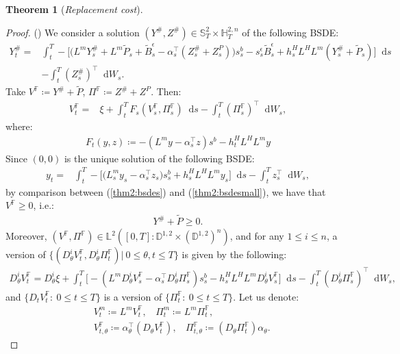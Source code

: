 \documentclass[a4paper, 11pt]{article}              %
\numberwithin{equation}{section}
\theoremstyle{plain}
\newcommand{\1}{\mathds{1}}
\newcommand{\Bt}{\tilde{B}}
\newcommand{\pt}{\tilde{P}}
\newcommand{\dsF}{\mathbb{F}}
\newcommand{\dsH}{\mathbb{H}}
\newcommand{\dsL}{\mathbb{L}}
\newcommand{\dsS}{\mathbb{S}}
\newcommand{\dsD}{\mathbb{D}}
\theoremstyle{plain}
\newtheorem{theorem}[thm]{Theorem}
\theoremstyle{definition}
\newtheorem{theorem}{Theorem}
\theoremstyle{plain}
\newcommand*\df{\mathop{}\!\mathrm{d}}
\newcommand{\rom}[1]{\lowercase\expandafter{\romannumeral #1\relax}}
\begin{document}
\begin{theorem}[\textit{Replacement cost}]
\begin{proof}
(\rom{1}) We consider  a solution $(Y^\#, Z^\#) \in \dsS^2_T \times \dsH^{2, n}_T$  of the following BSDE:
\begin{align}
  Y^\#_t
  =& \int_{t}^{T} -\bigg[\big(L^mY^\#_s+L^m\pt_s +\Bt^\epsilon_s-
     \alpha^\top_s(Z^\#_s+Z^P_s)\big)s^{b}_s - s^\epsilon_s\Bt^\epsilon_s
     +h^H_sL^HL^m(Y^\#_s+\pt_s)\bigg]\df s\nonumber\\
   & -\int_{t}^{T}(Z^\#_s)^\top\df W_s.    \nonumber 
\end{align}
Take $V^\dsF \coloneqq Y^\# + \pt $, $\Pi^\dsF\coloneqq Z^\# + Z^P$. Then:
\begin{align}
  V^\dsF_t
  =& \xi+\int_{t}^{T} F_s(V^\dsF_s, \Pi^\dsF_s)\df s
    -\int_{t}^{T}(\Pi^\dsF_s)^\top\df W_s, \label{thm2:bsdes}
\end{align}
where:
\begin{align}
  \label{eq:3}
  F_t(y, z)\coloneqq -(L^my - \alpha_s^\top z)s^b  -h^H_tL^HL^my
\end{align}
Since $(0,0)$ is the unique solution of the following BSDE:
\begin{align}
 y_t
  =& \int_{t}^{T} -\bigg[\big(L^m_sy_s - \alpha_s^\top z_s\big)s^{b}_s
     +h^H_sL^HL^my_s\bigg]\df s
    -\int_{t}^{T}z^\top_s\df W_s, \label{thm2:bsdesmall}
\end{align}
by comparison between (\ref{thm2:bsdes}) and (\ref{thm2:bsdesmall}), we have
that $V^\dsF \geq0$, i.e.:
\begin{align}
 Y^\# + \pt \geq0. \label{positive}  
\end{align}
Moreover, $(V^\dsF, \Pi^\dsF) \in
\dsL^2([0, T]\colon  \dsD^{1,2}\times (\dsD^{1,2})^n)$, and for any $1\leq i \leq n$, a
version of $\{(D^i_\theta V^\dsF_t, D^i_\theta \Pi^\dsF_t)| ~0\leq\theta, t \leq T\}$ is given by the following:
\begin{align}
  D^i_\theta V^\dsF_t=
   D^i_\theta \xi + \int_{t}^{T}\Big[ -(L^mD^i_\theta V^\dsF_s
    - \alpha^\top_s D^i_\theta \Pi^\dsF_s)s^b_s -h^H_sL^HL^m D_{\theta}^iV^\dsF_s
    \Big] \df s -\int_{t}^{T}(D^i_\theta \Pi^\dsF_s)^\top \df W_s, \nonumber 
\end{align}
and $\{D_tV^\dsF_t\colon~0\leq t\leq T\}$ is a version of $\{\Pi^\dsF_t\colon~0\leq t\leq
T\}$.
Let us denote:
\begin{eqnarray}
  &V^m_t\coloneqq L^m V^\dsF_t,
                  ~~~~\Pi^m_t\coloneqq L^m \Pi^\dsF_t, \nonumber \\  
  &V^\dsF_{t, \theta}\coloneqq \alpha ^\top _\theta (D_\theta V^\dsF_t),
                          ~~~~ \Pi^\dsF_{t, \theta}\coloneqq (D_\theta \Pi^\dsF_t)\alpha_\theta.\nonumber 

\end{eqnarray}
\end{proof}
\end{theorem}
\end{document}
